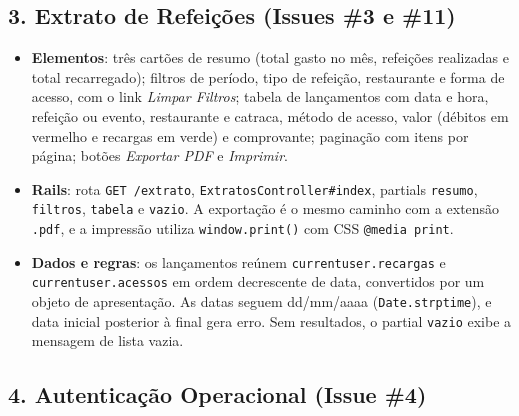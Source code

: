 \documentclass[a4paper,12pt]{article}
\renewcommand{\_}{\textunderscore\allowbreak}
\begin{document}
\subsection*{3. Extrato de Refeições (Issues \#3 e \#11)}

\begin{itemize}

    \item \textbf{Elementos}: três cartões de resumo (total gasto no mês, refeições realizadas e total recarregado); filtros de período, tipo de refeição, restaurante e forma de acesso, com o link \textit{Limpar Filtros}; tabela de lançamentos com data e hora, refeição ou evento, restaurante e catraca, método de acesso, valor (débitos em vermelho e recargas em verde) e comprovante; paginação com itens por página; botões \textit{Exportar PDF} e \textit{Imprimir}.

    \item \textbf{Rails}: rota \texttt{GET /extrato}, \texttt{ExtratosController\#\allowbreak{}index}, partials \texttt{\_resumo}, \texttt{\_filtros}, \texttt{\_tabela} e \texttt{\_vazio}. A exportação é o mesmo caminho com a extensão \texttt{.pdf}, e a impressão utiliza \texttt{window.\allowbreak{}print()} com CSS \texttt{@media print}.

    \item \textbf{Dados e regras}: os lançamentos reúnem \texttt{current\_user.\allowbreak{}recargas} e \texttt{current\_user.\allowbreak{}acessos} em ordem decrescente de data, convertidos por um objeto de apresentação. As datas seguem dd/\allowbreak{}mm/\allowbreak{}aaaa (\texttt{Date.\allowbreak{}strptime}), e data inicial posterior à final gera erro. Sem resultados, o partial \texttt{\_vazio} exibe a mensagem de lista vazia.

\end{itemize}

\subsection*{4. Autenticação Operacional (Issue \#4)}
\end{document}
